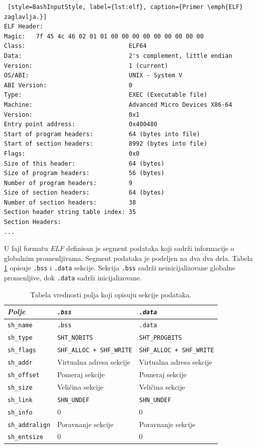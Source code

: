 \documentclass[12pt,oneside]{memoir}
\begin{document}
\begin{lstlisting} [style=BashInputStyle, label={lst:elf}, caption={Primer \emph{ELF} zaglavlja.}]
ELF Header:
Magic:   7f 45 4c 46 02 01 01 00 00 00 00 00 00 00 00 00 
Class:                             ELF64
Data:                              2's complement, little endian
Version:                           1 (current)
OS/ABI:                            UNIX - System V
ABI Version:                       0
Type:                              EXEC (Executable file)
Machine:                           Advanced Micro Devices X86-64
Version:                           0x1
Entry point address:               0x400480
Start of program headers:          64 (bytes into file)
Start of section headers:          8992 (bytes into file)
Flags:                             0x0
Size of this header:               64 (bytes)
Size of program headers:           56 (bytes)
Number of program headers:         9
Size of section headers:           64 (bytes)
Number of section headers:         38
Section header string table index: 35
Section Headers:
...
\end{lstlisting}

U fajl formatu \emph{ELF} definisan je segment podataka koji sadrži informacije o globalnim promenljivama. Segment podataka je podeljen na dva dva dela. Tabela \ref{tab:elf_secs} opisuje \texttt{.bss} i \texttt{.data} sekcije. Sekcija \texttt{.bss} sadrži neinicijalizovane globalne promenljive, dok \texttt{.data} sadrži inicijalizovane. 

\begin{table}
	\begin{center}
		\begin{tabular}{ | l | p{5cm} | p{5cm} |}
			\hline
			\emph{Polje} & \emph{\texttt{.bss}} & \emph{\texttt{.data}} \\ \hline
			\texttt{sh\_name} & \texttt{.bss} & \texttt{.data} \\ \hline
			\texttt{sh\_type} & \texttt{SHT\_NOBITS} & \texttt{SHT\_PROGBITS} \\ \hline
			\texttt{sh\_flags} & \texttt{SHF\_ALLOC + SHF\_WRITE} & \texttt{SHF\_ALLOC + SHF\_WRITE} \\ \hline
			\texttt{sh\_addr} & Virtualna adresa sekcije & Virtualna adresa sekcije \\ \hline
			\texttt{sh\_offset} & Pomeraj sekcije & Pomeraj sekcije \\ \hline
			\texttt{sh\_size} & Veličina sekcije & Veličina sekcije \\ \hline
			\texttt{sh\_link} & \texttt{SHN\_UNDEF} & \texttt{SHN\_UNDEF} \\ \hline
			\texttt{sh\_info} & 0 & 0 \\ \hline
			\texttt{sh\_addralign} & Poravnanje sekcije & Poravnanje sekcije \\ \hline
			\texttt{sh\_entsize} & 0 & 0 \\ \hline
		\end{tabular}
	\end{center}
	\caption{\label{tab:elf_secs}Tabela vrednosti polja koji opisuju sekcije podataka.}
\end{table}
\end{document}
